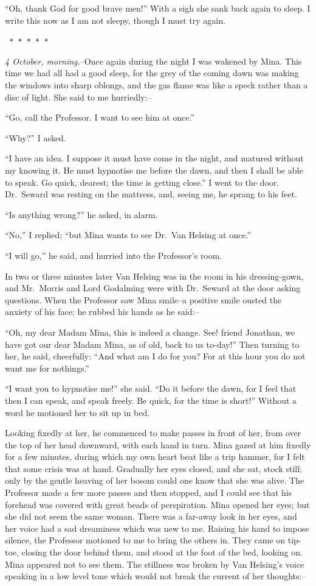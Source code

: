 \documentclass[12pt,openright]{book}
\begin{document}
“Oh, thank God for good brave men!” With a sigh she sank back again to sleep. I write this now as I am not sleepy, though I must try again.

\texttt{   *       *       *       *       *}

\textit{4 October, morning.}–Once again during the night I was wakened by Mina. This time we had all had a good sleep, for the grey of the coming dawn was making the windows into sharp oblongs, and the gas flame was like a speck rather than a disc of light. She said to me hurriedly:–

“Go, call the Professor. I want to see him at once.”

“Why?” I asked.

“I have an idea. I suppose it must have come in the night, and matured without my knowing it. He must hypnotise me before the dawn, and then I shall be able to speak. Go quick, dearest; the time is getting close.” I went to the door. Dr. Seward was resting on the mattress, and, seeing me, he sprang to his feet.

“Is anything wrong?” he asked, in alarm.

“No,” I replied; “but Mina wants to see Dr. Van Helsing at once.”

“I will go,” he said, and hurried into the Professor’s room.

In two or three minutes later Van Helsing was in the room in his dressing-gown, and Mr. Morris and Lord Godalming were with Dr. Seward at the door asking questions. When the Professor saw Mina smile–a positive smile ousted the anxiety of his face; he rubbed his hands as he said:–

“Oh, my dear Madam Mina, this is indeed a change. See! friend Jonathan, we have got our dear Madam Mina, as of old, back to us to-day!” Then turning to her, he said, cheerfully: “And what am I do for you? For at this hour you do not want me for nothings.”

“I want you to hypnotise me!” she said. “Do it before the dawn, for I feel that then I can speak, and speak freely. Be quick, for the time is short!” Without a word he motioned her to sit up in bed.

Looking fixedly at her, he commenced to make passes in front of her, from over the top of her head downward, with each hand in turn. Mina gazed at him fixedly for a few minutes, during which my own heart beat like a trip hammer, for I felt that some crisis was at hand. Gradually her eyes closed, and she sat, stock still; only by the gentle heaving of her bosom could one know that she was alive. The Professor made a few more passes and then stopped, and I could see that his forehead was covered with great beads of perspiration. Mina opened her eyes; but she did not seem the same woman. There was a far-away look in her eyes, and her voice had a sad dreaminess which was new to me. Raising his hand to impose silence, the Professor motioned to me to bring the others in. They came on tip-toe, closing the door behind them, and stood at the foot of the bed, looking on. Mina appeared not to see them. The stillness was broken by Van Helsing’s voice speaking in a low level tone which would not break the current of her thoughts:–
\end{document}
